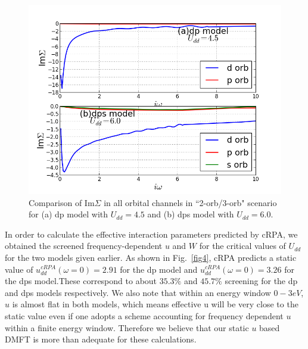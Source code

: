 \documentclass[10pt]{ruthesis}
\begin{document}
{%

\begin{figure}[H]
 \includegraphics[width=\columnwidth]{./plotForpublishing/pd+dpssigma.png}
 \caption{\label{fig3}Comparison of Im$\Sigma$ in all orbital channels in ``2-orb/3-orb" scenario for (a) dp model with $U_{dd}=4.5 $ and (b) dps model with $U_{dd}=6.0$.}
\end{figure}

In order to calculate the effective interaction parameters predicted by cRPA, we obtained  the screened frequency-dependent $u$ and $W$ for the critical values of $U_{dd}$ for the two models given earlier. As shown in Fig.~\ref{fig4}, cRPA predicts a static value of $u^{cRPA}_{dd}(\omega=0)= 2.91$ for the dp model and $u^{cRPA}_{dd}(\omega=0)=3.26$ for the dps model.These correspond to about $35.3\% $ and $45.7\%$ screening for the dp and dps models respectively. We also note that within an energy window $0-3eV$, $u$ is almost flat in both models, which means effective u will be very close to the static value even if one adopts a scheme accounting for frequency dependent $u$ within a finite energy window. Therefore we believe that our static $u$ based DMFT is more than adequate for these calculations.

}
\end{document}
